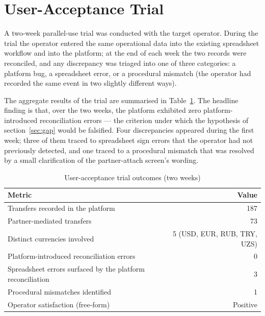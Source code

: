 \section{User-Acceptance Trial}
\label{sec:uat}

A two-week parallel-use trial was conducted with the target operator. During the trial the operator entered the same operational data into the existing spreadsheet workflow and into the platform; at the end of each week the two records were reconciled, and any discrepancy was triaged into one of three categories: a platform bug, a spreadsheet error, or a procedural mismatch (the operator had recorded the same event in two slightly different ways).

The aggregate results of the trial are summarised in Table~\ref{tab:uat}. The headline finding is that, over the two weeks, the platform exhibited zero platform-introduced reconciliation errors --- the criterion under which the hypothesis of section~\ref{sec:gap} would be falsified. Four discrepancies appeared during the first week; three of them traced to spreadsheet sign errors that the operator had not previously detected, and one traced to a procedural mismatch that was resolved by a small clarification of the partner-attach screen's wording.

{\singlespacing
\begin{table}[h]
  \caption{User-acceptance trial outcomes (two weeks)}
  \label{tab:uat}
  \centering
  \begin{tabular}{lr}
    \toprule
    \textbf{Metric}                                       & \textbf{Value}\\
    \midrule
    Transfers recorded in the platform                   & 187\\
    Partner-mediated transfers                            & 73\\
    Distinct currencies involved                          & 5 (USD, EUR, RUB, TRY, UZS)\\
    Platform-introduced reconciliation errors             & 0\\
    Spreadsheet errors surfaced by the platform reconciliation & 3\\
    Procedural mismatches identified                      & 1\\
    Operator satisfaction (free-form)                     & Positive\\
    \bottomrule
  \end{tabular}
\end{table}
}

